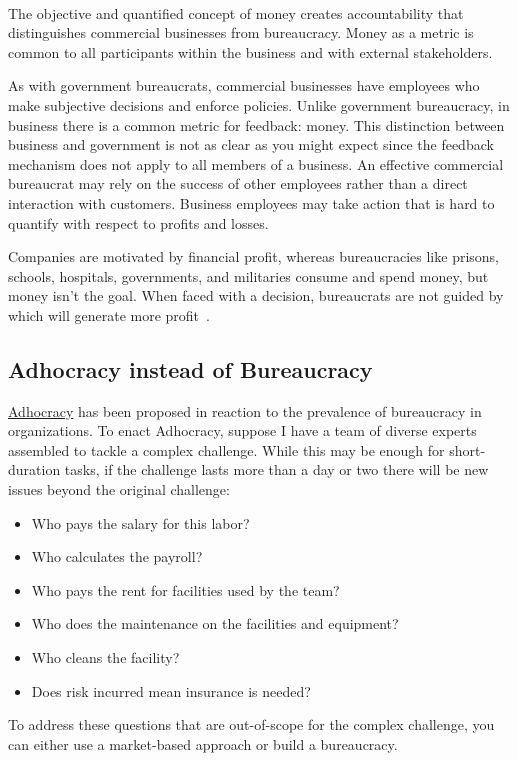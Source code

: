 \ \\

The objective and quantified concept of money creates accountability that distinguishes commercial businesses from bureaucracy. Money as a metric is common to all participants within the business and with external stakeholders. 

As with government bureaucrats, commercial businesses have employees who make subjective decisions and enforce policies. Unlike government bureaucracy, in business there is a common metric for feedback: money. This distinction between business and government is not as clear as you might expect since the feedback mechanism does not apply to all members of a business. An effective commercial bureaucrat may rely on the success of other employees rather than a direct interaction with customers. Business employees may take action that is hard to quantify with respect to profits and losses.

Companies are motivated by financial profit, whereas bureaucracies like prisons, schools, hospitals, governments, and militaries  consume and spend money, but money isn't the goal. When faced with a decision, bureaucrats are not guided by which will generate more profit~\cite{2012_Wilson}.

\subsection*{Adhocracy instead of Bureaucracy}

\href{https://en.wikipedia.org/wiki/Adhocracy}{Adhocracy} 
has been proposed in reaction to the prevalence of bureaucracy in organizations. To enact Adhocracy, suppose I have a team of diverse experts assembled to tackle a complex challenge.
While this may be enough for short-duration tasks, if the challenge lasts more than a day or two there will be new issues beyond the original challenge:

\begin{itemize}
    \item Who pays the salary for this labor?
    \item Who calculates the payroll?
    \item Who pays the rent for facilities used by the team?
    \item Who does the maintenance on the facilities and equipment?
    \item Who cleans the facility?
    \item Does risk incurred mean insurance is needed?
\end{itemize}
To address these questions that are out-of-scope for the complex challenge, you can either use a market-based approach or build a bureaucracy. 

